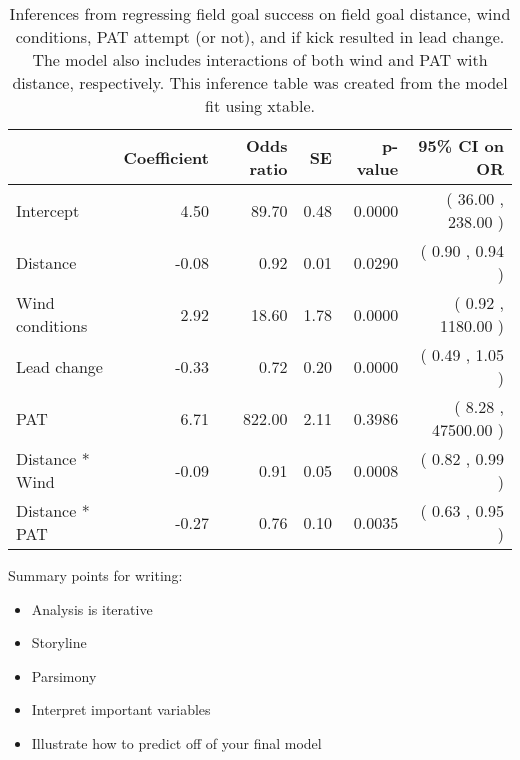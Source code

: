 \documentclass[11pt]{article}
\begin{document}
\begin{table}[ht]
\centering
\begin{tabular}{|l|rrrrr|}
  \hline
 & Coefficient & Odds ratio & SE & p-value & 95\% CI on OR \\ 
  \hline
Intercept & 4.50 & 89.70 & 0.48 & 0.0000 & ( 36.00 , 238.00 ) \\ 
  Distance & -0.08 & 0.92 & 0.01 & 0.0290 & ( 0.90 , 0.94 ) \\ 
  Wind conditions & 2.92 & 18.60 & 1.78 & 0.0000 & ( 0.92 , 1180.00 ) \\ 
  Lead change & -0.33 & 0.72 & 0.20 & 0.0000 & ( 0.49 , 1.05 ) \\ 
  PAT & 6.71 & 822.00 & 2.11 & 0.3986 & ( 8.28 , 47500.00 ) \\ 
  Distance * Wind & -0.09 & 0.91 & 0.05 & 0.0008 & ( 0.82 , 0.99 ) \\ 
  Distance * PAT & -0.27 & 0.76 & 0.10 & 0.0035 & ( 0.63 , 0.95 ) \\ 
   \hline
\end{tabular}
\caption{Inferences from regressing field goal success on field goal distance,
                  wind conditions, PAT attempt (or not), and if kick resulted in lead change.  The model also 
                  includes interactions of both wind and PAT with distance, respectively. 
                  This inference table was created from the model fit using xtable.} 
\label{LRinf}
\end{table}

\vspace{1cm}
\Large
\noindent Summary points for writing:
\begin{itemize}
\item Analysis is iterative
\item Storyline
\item Parsimony
\item Interpret important variables
\item Illustrate how to predict off of your final model
\end{itemize}
\end{document}

